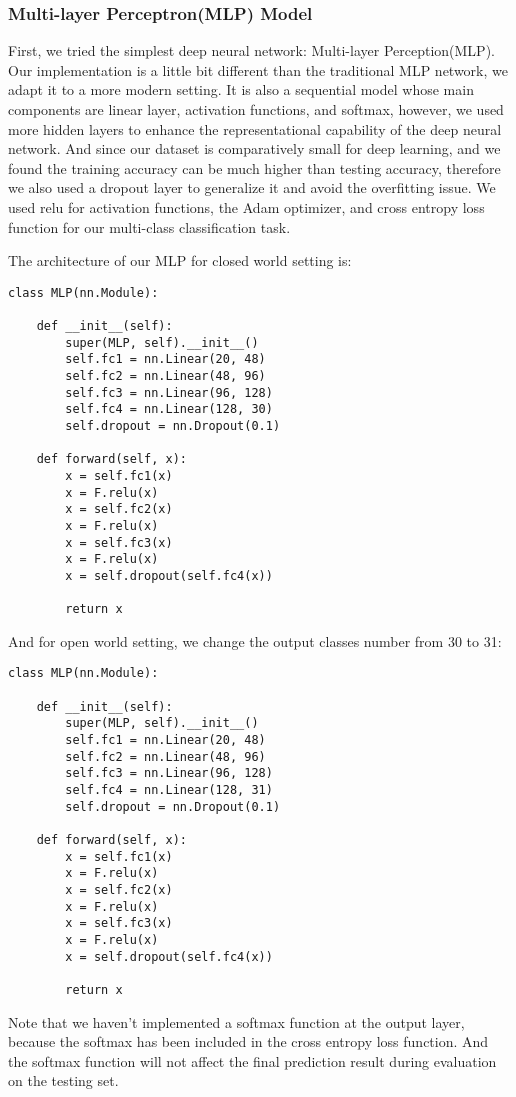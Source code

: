 \documentclass[conference]{IEEEtran}
\begin{document}
\subsubsection{Multi-layer Perceptron(MLP) Model}
First, we tried the simplest deep neural network: Multi-layer Perception(MLP). Our implementation is a little bit different than the traditional MLP network, we adapt it to a more modern setting. It is also a sequential model whose main components are linear layer, activation functions, and softmax, however, we used more hidden layers to enhance the representational capability of the deep neural network. And since our dataset is comparatively small for deep learning, and we found the training accuracy can be much higher than testing accuracy, therefore we also used a dropout layer to generalize it and avoid the overfitting issue. We used relu for activation functions, the Adam optimizer, and cross entropy loss function for our multi-class classification task.

The architecture of our MLP for closed world setting is:
\begin{lstlisting}
class MLP(nn.Module):
    
    def __init__(self):
        super(MLP, self).__init__()
        self.fc1 = nn.Linear(20, 48)
        self.fc2 = nn.Linear(48, 96)
        self.fc3 = nn.Linear(96, 128)
        self.fc4 = nn.Linear(128, 30)
        self.dropout = nn.Dropout(0.1)
        
    def forward(self, x):
        x = self.fc1(x)
        x = F.relu(x)
        x = self.fc2(x)
        x = F.relu(x)
        x = self.fc3(x)
        x = F.relu(x)
        x = self.dropout(self.fc4(x))
        
        return x
\end{lstlisting}
And for open world setting, we change the output classes number from 30 to 31:
\begin{lstlisting}
class MLP(nn.Module):
    
    def __init__(self):
        super(MLP, self).__init__()
        self.fc1 = nn.Linear(20, 48)
        self.fc2 = nn.Linear(48, 96)
        self.fc3 = nn.Linear(96, 128)
        self.fc4 = nn.Linear(128, 31)
        self.dropout = nn.Dropout(0.1)
        
    def forward(self, x):
        x = self.fc1(x)
        x = F.relu(x)
        x = self.fc2(x)
        x = F.relu(x)
        x = self.fc3(x)
        x = F.relu(x)
        x = self.dropout(self.fc4(x))
        
        return x
\end{lstlisting}
Note that we haven't implemented a softmax function at the output layer, because the softmax has been included in the cross entropy loss function. And the softmax function will not affect the final prediction result during evaluation on the testing set.
\end{document}
